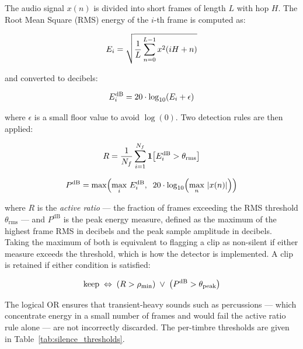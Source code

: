 \par \vspace{0.3cm}
The audio signal $x(n)$ is divided into short frames of length $L$ with hop $H$. The Root Mean Square (RMS) energy of the $i$-th frame is computed as:

\begin{equation}
E_i = \sqrt{\frac{1}{L} \sum_{n=0}^{L-1} x^2(iH + n)}
\label{eq:rms}\eqname{Frame RMS energy}
\end{equation}

\noindent and converted to decibels:

\begin{equation}
E_i^{\text{dB}} = 20 \cdot \log_{10}(E_i + \epsilon)
\label{eq:rms_db}\eqname{RMS energy in decibels}
\end{equation}

\noindent where $\epsilon$ is a small floor value to avoid $\log(0)$. Two detection rules are then applied:

\begin{equation}
R = \frac{1}{N_f} \sum_{i=1}^{N_f} \mathbf{1}\!\left[E_i^{\text{dB}} > \theta_{\text{rms}}\right]
\label{eq:active_ratio}\eqname{Active-frame ratio}
\end{equation}

\begin{equation}
P^{\text{dB}} = \max\!\left(\max_{i}\, E_i^{\text{dB}},\;\; 20 \cdot \log_{10}\!\left(\max_{n}\,|x(n)|\right)\right)
\label{eq:peak_db}\eqname{Peak energy measure}
\end{equation}

\noindent where $R$ is the \textit{active ratio} — the fraction of frames exceeding the RMS threshold $\theta_{\text{rms}}$ — and $P^{\text{dB}}$ is the peak energy measure, defined as the maximum of the highest frame RMS in decibels and the peak sample amplitude in decibels. Taking the maximum of both is equivalent to flagging a clip as non-silent if either measure exceeds the threshold, which is how the detector is implemented. A clip is retained if either condition is satisfied:

\begin{equation}
\text{keep} \;\Leftrightarrow\; \left(R > \rho_{\min}\right) \;\vee\; \left(P^{\text{dB}} > \theta_{\text{peak}}\right)
\label{eq:keep_rule}\eqname{Silence-filter keep rule}
\end{equation}

\noindent The logical OR ensures that transient-heavy sounds such as percussions — which concentrate energy in a small number of frames and would fail the active ratio rule alone — are not incorrectly discarded. The per-timbre thresholds are given in Table~\ref{tab:silence_thresholds}.

